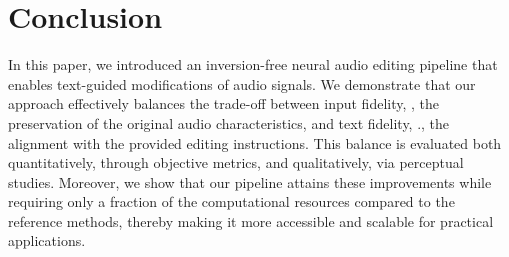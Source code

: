 \section{Conclusion}
In this paper, we introduced an inversion-free neural audio editing pipeline that enables text-guided modifications of audio signals. We demonstrate that our approach effectively balances the trade-off between input fidelity, \ie, the preservation of the original audio characteristics, and text fidelity, \ie., the alignment with the provided editing instructions. This balance is evaluated both quantitatively, through objective metrics, and qualitatively, via perceptual studies. Moreover, we show that our pipeline attains these improvements while requiring only a fraction of the computational resources compared to the reference methods, thereby making it more accessible and scalable for practical applications.

\vfill
\pagebreak
